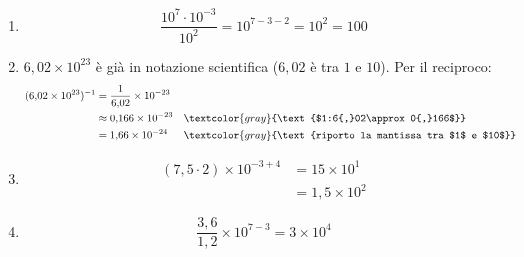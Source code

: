 \begin{question}[ID=1.4, subtitle={Potenze di 10 e notazione scientifica}, tags={potenze, notazione scientifica}, difficulty=facile]
\begin{explanation}
\begin{enumerate}
\[\begin{aligned}
    (3{,}2\times10^4)\cdot(5\times10^{-2}) &= (3{,}2\cdot5)\times10^{4-2} && \textcolor{gray}{\text{numeri con numeri, potenze con potenze}}\\
    &= 16\times10^2\\
    &= 1{,}6\times10^3 && \textcolor{gray}{\text{$16=1{,}6\times10$}}
    \end{aligned}\]
    \item \[ \dfrac{10^7\cdot10^{-3}}{10^2}=10^{7-3-2}=10^2=100 \]
    \item $6{,}02\times10^{23}$ è già in notazione scientifica ($6{,}02$ è tra $1$ e $10$). Per il reciproco:
    \[\begin{aligned}
    (6{,}02\times10^{23})^{-1} &= \dfrac{1}{6{,}02}\times10^{-23}\\
    &\approx 0{,}166\times10^{-23} && \textcolor{gray}{\text{$1:6{,}02\approx0{,}166$}}\\
    &= 1{,}66\times10^{-24} && \textcolor{gray}{\text{riporto la mantissa tra $1$ e $10$}}
    \end{aligned}\]
    \item \[\begin{aligned}
    (7{,}5\cdot2)\times10^{-3+4} &= 15\times10^1\\
    &= 1{,}5\times10^2
    \end{aligned}\]
    \item \[ \dfrac{3{,}6}{1{,}2}\times10^{7-3}=3\times10^4 \]
\end{enumerate}
\end{explanation}
\end{question}


